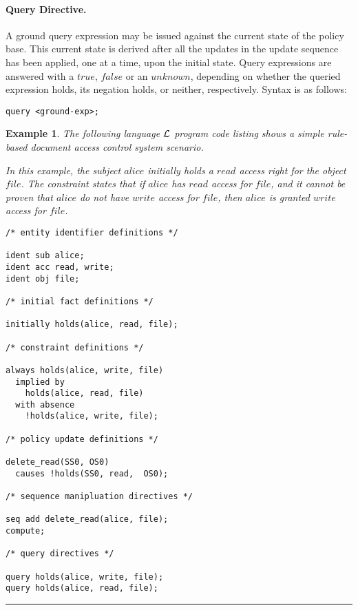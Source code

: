 \documentclass[10pt, twocolumn]{article}
\newtheorem{examp}{Example}
\newenvironment{example}{\begin{examp}\rm}{\rule{2mm}{2mm}\end{examp}}
\begin{document}
        \paragraph{Query Directive.}

          A ground query expression may be issued against the current state of
          the policy base. This current state is derived after all the updates
          in the update sequence has been applied, one at a time, upon the
          initial state. Query expressions are answered with a $true$, $false$
          or an $unknown$, depending on whether the queried expression holds,
          its negation holds, or neither, respectively. Syntax is as follows:

          \begin{verbatim}query <ground-exp>;\end{verbatim} 

        \begin{example}
          The following language ${\cal L}$ program code listing shows a simple
          rule-based document access control system scenario.

          In this example, the subject $alice$ initially holds a $read$ access
          right for the object $file$. The constraint states that if $alice$
          has $read$ access for $file$, and it cannot be proven that $alice$ do
          not have $write$ access for $file$, then $alice$ is granted $write$
          access for $file$.

          \begin{verbatim}
/* entity identifier definitions */

ident sub alice;
ident acc read, write;
ident obj file;

/* initial fact definitions */

initially holds(alice, read, file);

/* constraint definitions */

always holds(alice, write, file) 
  implied by
    holds(alice, read, file)
  with absence
    !holds(alice, write, file);

/* policy update definitions */

delete_read(SS0, OS0)
  causes !holds(SS0, read,  OS0);

/* sequence manipluation directives */

seq add delete_read(alice, file);
compute;

/* query directives */

query holds(alice, write, file);
query holds(alice, read, file);
          \end{verbatim}
        \end{example}
\end{document}
